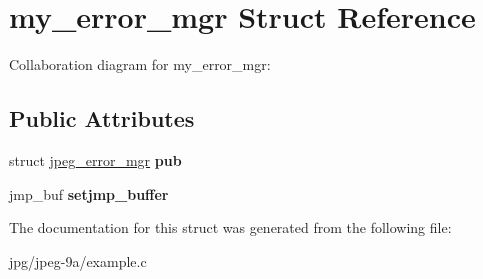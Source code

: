 \hypertarget{structmy__error__mgr}{\section{my\+\_\+error\+\_\+mgr Struct Reference}
\label{structmy__error__mgr}
}


Collaboration diagram for my\+\_\+error\+\_\+mgr\+:
\subsection*{Public Attributes}
\begin{DoxyCompactItemize}
\item 
\hypertarget{structmy__error__mgr_aac1fb61cc51b4d8edbb44ba85fcccdb4}{struct \hyperlink{structjpeg__error__mgr}{jpeg\+\_\+error\+\_\+mgr} {\bfseries pub}}\label{structmy__error__mgr_aac1fb61cc51b4d8edbb44ba85fcccdb4}

\item 
\hypertarget{structmy__error__mgr_a751138dd0c774fe1d41bb5465b3a7539}{jmp\+\_\+buf {\bfseries setjmp\+\_\+buffer}}\label{structmy__error__mgr_a751138dd0c774fe1d41bb5465b3a7539}

\end{DoxyCompactItemize}


The documentation for this struct was generated from the following file\+:\begin{DoxyCompactItemize}
\item 
jpg/jpeg-\/9a/example.\+c\end{DoxyCompactItemize}
